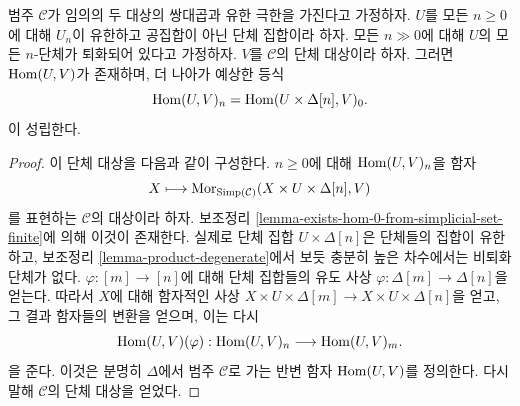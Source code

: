\begin{lemma}
\label{lemma-exists-hom-from-simplicial-set-finite}
범주 $\mathcal{C}$가 임의의 두 대상의 쌍대곱과 유한 극한을 가진다고
가정하자. $U$를 모든 $n \geq 0$에 대해 $U_n$이 유한하고
공집합이 아닌 단체 집합이라 하자.
모든 $n \gg 0$에 대해 $U$의 모든 $n$-단체가 퇴화되어 있다고
가정하자. $V$를 $\mathcal{C}$의 단체 대상이라 하자.
그러면 $\mathop{\mathrm{Hom}}\nolimits(U, V)$가 존재하며, 더 나아가 예상한 등식
$$
\mathop{\mathrm{Hom}}\nolimits(U, V)_n = \mathop{\mathrm{Hom}}\nolimits(U \times \Delta[n], V)_0.
$$
이 성립한다.
\end{lemma}

\begin{proof}
이 단체 대상을 다음과 같이 구성한다.
$n \geq 0$에 대해 $\mathop{\mathrm{Hom}}\nolimits(U, V)_n$을 함자
$$
X
\longmapsto
\mathop{\mathrm{Mor}}\nolimits_{\text{Simp}(\mathcal{C})}(X \times U \times \Delta[n], V)
$$
를 표현하는 $\mathcal{C}$의 대상이라 하자.
보조정리 \ref{lemma-exists-hom-0-from-simplicial-set-finite}에 의해
이것이 존재한다. 실제로 단체 집합 $U \times \Delta[n]$은 단체들의
집합이 유한하고, 보조정리 \ref{lemma-product-degenerate}에서 보듯
충분히 높은 차수에서는 비퇴화 단체가 없다.
$\varphi : [m] \to [n]$에 대해 단체 집합들의 유도 사상
$\varphi : \Delta[m] \to \Delta[n]$을 얻는다.
따라서 $X$에 대해 함자적인 사상
$X \times U \times \Delta[m] \to X \times U \times \Delta[n]$을 얻고,
그 결과 함자들의 변환을 얻으며, 이는 다시
$$
\mathop{\mathrm{Hom}}\nolimits(U, V)(\varphi) :
\mathop{\mathrm{Hom}}\nolimits(U, V)_n
\longrightarrow
\mathop{\mathrm{Hom}}\nolimits(U, V)_m.
$$
을 준다. 이것은 분명히 $\Delta$에서 범주 $\mathcal{C}$로 가는
반변 함자 $\mathop{\mathrm{Hom}}\nolimits(U, V)$를 정의한다.
다시 말해 $\mathcal{C}$의 단체 대상을 얻었다.


\end{proof}
